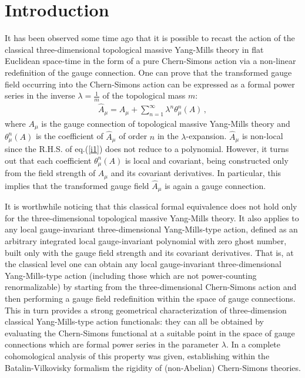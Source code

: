 \documentclass[a4paper,11pt]{article}
\begin{document}


\section{Introduction}

It has been observed some time ago \cite{sorella1,sorella2} that 
it is possible to recast the action of the 
classical three-dimensional topological  massive Yang-Mills theory
in flat Euclidean space-time
in the form of a pure Chern-Simons action via a non-linear 
redefinition of the gauge connection.
One can prove \cite{sorella1, sorella2} that the transformed
gauge field occurring into the Chern-Simons action
can be expressed as a formal power series
in the inverse $\lambda=\frac{1}{m}$ of the topological mass $m$:
%
\begin{eqnarray}
\hat A_\mu = A_\mu + \sum_{n=1}^\infty \lambda^n \theta^n_\mu(A) \, ,
\label{i1}
\end{eqnarray}
%
where $A_\mu$ is the gauge connection of topological massive Yang-Mills
theory and $\theta^n_\mu(A)$ is
the coefficient of $\hat A_\mu$ of order $n$ in the $\lambda$-expansion.
$\hat A_\mu$ is non-local since the R.H.S. of eq.(\ref{i1})
does not reduce to a polynomial. However, it turns out that
each coefficient $\theta^n_\mu(A)$ 
is local and covariant, being constructed only from the
field strength of $A_\mu$  and its covariant derivatives.
In particular, this implies that the transformed gauge field 
$\hat A_\mu$ is  again a gauge connection.

It is worthwhile noticing that this classical formal equivalence 
does not hold only for the three-dimensional 
topological massive Yang-Mills theory. It also applies
\cite{sorella2,Barnich:vg} to any local gauge-invariant
three-dimensional 
Yang-Mills-type action, defined as an arbitrary integrated local
gauge-invariant polynomial with zero ghost number,
built only with the gauge field strength and its covariant
derivatives. That is, at the classical level one can obtain
any local gauge-invariant three-dimensional Yang-Mills-type action (including those
which are not power-counting renormalizable) by starting
from the three-dimensional Chern-Simons action and then performing
a gauge field redefinition within the space of gauge connections.
This in turn provides a strong geometrical characterization
\cite{sorella2} of
three-dimension classical Yang-Mills-type action functionals: they 
can all be obtained
by evaluating the Chern-Simons functional at a suitable point
in the space of gauge connections which are formal power series
in the parameter $\lambda$.
In \cite{Barnich:vg} a complete cohomological analysis of this
property was given, establishing within the Batalin-Vilkovisky
formalism the rigidity of (non-Abelian) Chern-Simons theories.
\end{document}
